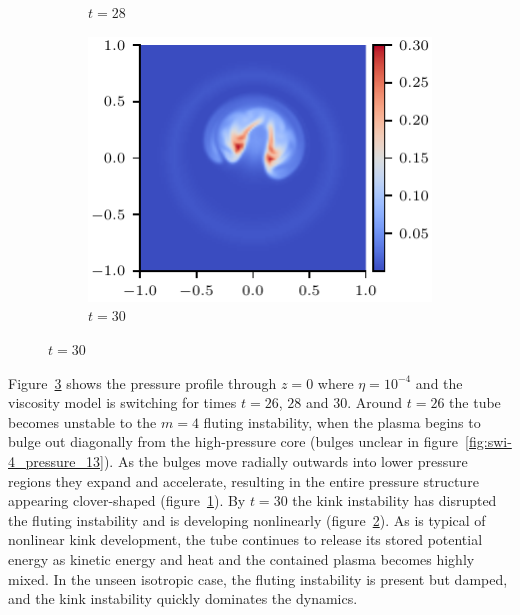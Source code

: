 \begin{figure}[t]
\begin{subfigure}{0.32\textwidth}
      \caption{$t=28$}
      \label{fig:swi-4_pressure_14}
    \end{subfigure}
    \hfill
    \begin{subfigure}{0.32\textwidth}
      \includegraphics[width=\linewidth]{swi-4_pressure_15.pdf}
      \caption{$t=30$}
      \label{fig:swi-4_pressure_15}
    \end{subfigure}
\label{fig:kink_pressure_slices-4}%
\end{figure}

Figure~\ref{fig:kink_pressure_slices-4} shows the pressure profile through $z=0$ where $\eta=10^{-4}$ and the viscosity model is switching for times $t=26$, $28$ and $30$. Around $t=26$ the tube becomes unstable to the $m=4$ fluting instability, when the plasma begins to bulge out diagonally from the high-pressure core (bulges unclear in figure~\ref{fig:swi-4_pressure_13}). As the bulges move radially outwards into lower pressure regions they expand and accelerate, resulting in the entire pressure structure appearing clover-shaped (figure~\ref{fig:swi-4_pressure_14}). By $t=30$ the kink instability has disrupted the fluting instability and is developing nonlinearly (figure~\ref{fig:swi-4_pressure_15}). As is typical of nonlinear kink development, the tube continues to release its stored potential energy as kinetic energy and heat and the contained plasma becomes highly mixed. In the unseen isotropic case, the fluting instability is present but damped, and the kink instability quickly dominates the dynamics.

